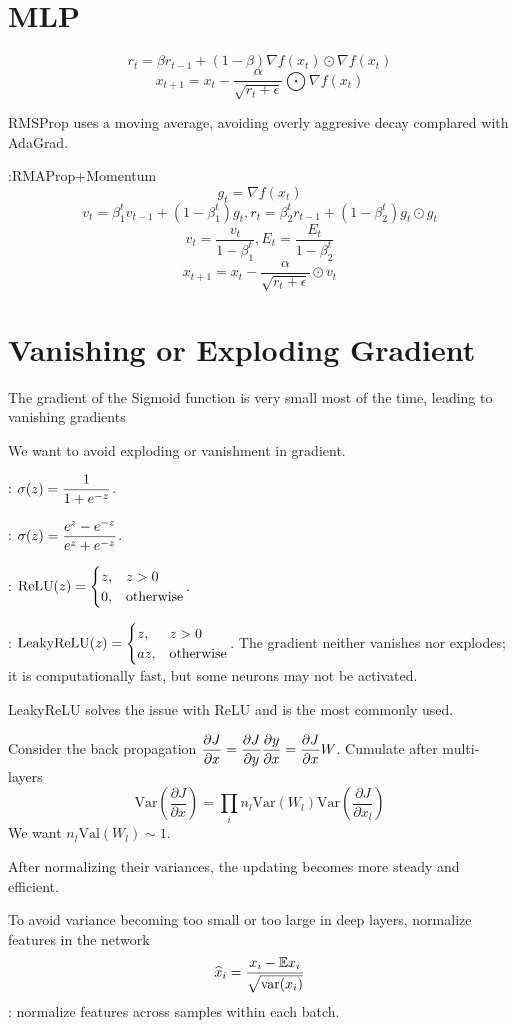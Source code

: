 \section{MLP}

\[r_t=\beta r_{t-1}+(1-\beta)\nabla f(x_t)\odot \nabla f(x_t)\]
\[x_{t+1}=x_t-\frac{\alpha}{\sqrt{r_t+\epsilon}}\bigodot  \nabla f(x_t)\]

RMSProp uses a moving average, avoiding overly aggresive decay complared with AdaGrad.

:RMAProp+Momentum 
\[g_t=\nabla f(x_t)\]
\[v_t=\beta_1^t v_{t-1}+(1-\beta_1^t)g_t, r_t=\beta_2^t r_{t-1}+(1-\beta_2^t)g_t\odot g_t\]
\[v_t=\frac{v_t}{1-\beta_1^t},E_t=\frac{E_t}{1-\beta_2^t}\]
\[x_{t+1}=x_t-\frac{\alpha}{\sqrt{r_t+\epsilon}}\odot v_t\]

\section{Vanishing or Exploding Gradient}
The gradient of the Sigmoid function is very small most of the time, leading to vanishing gradients

We want to avoid exploding or vanishment in gradient.

: $ \displaystyle\sigma(z)=\frac{1}{1+e^{-z}} $.

: $ \displaystyle\sigma(z)=\frac{e^{z}-e^{-z}}{e^z+e^{-z}} $.

:  $ \displaystyle\mathrm{ReLU}(z)=\begin{cases}
    z,&z>0\\
    0,&\text{otherwise}
\end{cases} $.

: $ \displaystyle \mathrm{LeakyReLU}(z)=\begin{cases}
    z,&z>0\\
    az,&\text{otherwise}
\end{cases} $.
The gradient neither vanishes nor explodes; it is computationally fast, but some neurons may not be activated.

LeakyReLU solves the issue with ReLU and is the most commonly used.

Consider the back propagation  $ \displaystyle\frac{\partial J}{\partial x}=\frac{\partial J}{\partial y}\frac{\partial y}{\partial x}=\frac{\partial J}{\partial x}W$. Cumulate after multi-layers
\[\mathrm{Var}(\frac{\partial J}{\partial x})=\prod_i n_l \mathrm{Var}(W_l)\mathrm{Var}(\frac{\partial J}{\partial x_l})\]
We want   $ n_l\mathrm{Val}(W_l)\sim 1 $. 

After normalizing their variances, the updating becomes more steady and efficient.

To avoid variance becoming too small or too large in deep layers, normalize features in the network 
\[\widehat{x}_i=\frac{x_i-\mathbb E x_i}{\sqrt{\mathrm{var}(x_i)}}\]
: normalize features across samples within each batch.



